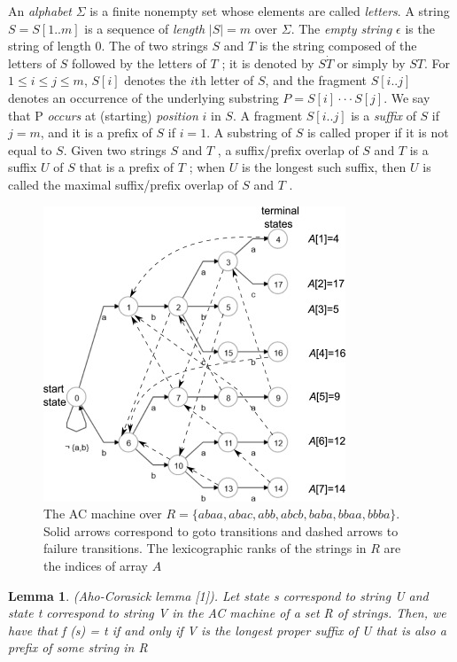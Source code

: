 \documentclass[twocolumn]{article}
\newtheorem{lemma}[theorem]{Lemma}
\begin{document}
An \textit{alphabet} $\Sigma$ is a finite nonempty set whose elements 
are  called  \textit{letters}.  A  string $S = S[1 . . m]$ is  a  sequence  of \textit{length} $|S| = m$ over $\Sigma$.  The  \textit{empty string} $\epsilon$ is  the  string  of 
length  0. The \textit{} of two strings  $S$ and  $T$ is the string composed of the letters of  $S$ followed by the letters 
of  $T$ ;  it  is  denoted  by  $S \dot T$ or  simply  by  $ST$.  For  $1 \leq i \leq
j \leq m$,  $S[i]$ denotes  the  $i$th  letter  of  $S$,  and  the  fragment 
$S[i . .  j]$ denotes  an  occurrence of  the  underlying  substring
$P = S[i] · · · S[j]$. We say that  P \textit{occurs} at (starting) \textit{position}
$i$ in  $S$. A fragment  $S[i . .  j]$ is a \textit{suffix} of  $S$ if  $j = m$, and it is 
a prefix of  $S$ if $i = 1$. A substring of  $S$ is called proper if it 
is not equal to  $S$. Given two strings  $S$ and $T$ , a suffix/prefix 
overlap of  $S$ and  $T$ is  a  suffix  $U$ of  $S$ that  is  a  prefix  of 
$T$ ; when $U$ is the longest such suffix, then $U$ is called the 
maximal suffix/prefix overlap of  $S$ and $T$ .

\pagebreak

\begin{figure}[!htb]
    \centering
    \includegraphics{Fig. 1.jpg}
    \caption{The AC machine over $R = \{ abaa, abac, abb, abcb, baba, bbaa,
bbba \}$. Solid arrows correspond to goto transitions and dashed arrows to failure transitions. The lexicographic ranks of the strings in $R$ are the indices of array $A$}
    \label{fig:my_label}
\end{figure}

\begin{lemma}
\textit{(Aho-Corasick lemma [1]). Let state s correspond to 
string U and  state t correspond to string V in  the AC machine of 
a set R of  strings. Then, we have that  f (s) = t if  and only if V is  
the longest proper suffix of U that  is also a prefix of some string 
in R}
\end{lemma}
\end{document}
